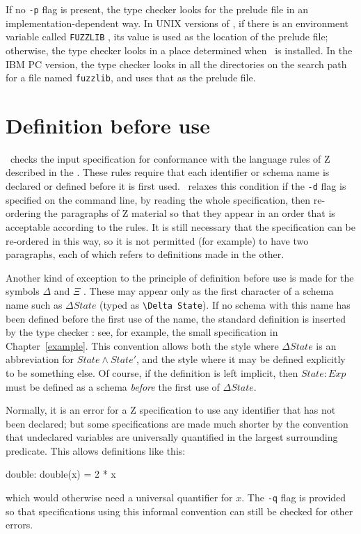 If no \verb/-p/ flag is present, the type checker
looks for the prelude file in an
implementation-dependent way.  In UNIX versions of \fuzz, if there
is an environment variable called \verb/FUZZLIB/%
, its value is used as the
location of the 
prelude file; otherwise, the type checker looks in a place
determined when \fuzz\ is installed.  In the IBM PC version, the
type checker looks in all the directories on the search path for a
file named \verb/fuzzlib/, and uses that as the prelude
file.

\section{Definition before use}

\Fuzz\ checks the input specification for conformance with the
language rules of Z described in the \ZRM. 
These rules require that each identifier or schema name is declared or
defined before it 
is first used. 
\Fuzz\ relaxes this condition if the \verb/-d/ flag is specified on
the command line, by reading the whole specification, then re-ordering
the paragraphs of Z material so that they appear in an order that is
acceptable according to the rules.
It is still necessary that the specification can be re-ordered in this
way, so it is not permitted (for example) to have two paragraphs, each
of which refers to definitions made in the other.

Another kind of exception to the principle of definition before use is
made for the symbols $\Delta$ and $\Xi$\index{|\Delta| ($\Delta$)}%
\index{|\Xi| ($\Xi$)}. These
may appear only as the first character of a schema name such as
$\Delta State$ (typed as \verb/\Delta State/). If no schema with
this name has been defined before the first use of the name, the
standard definition is inserted by the type checker%
: see, for example,
the small 
specification in Chapter~\ref{example}. This convention allows both
the style where $\Delta State$ is an abbreviation for $State \land
State'$, and the style where it may be defined explicitly to be
something else.  Of course, if the definition is left implicit, then
$State: Exp $ must be defined as a schema {\em before\/} the first use of
$\Delta State$.

Normally, it is an error for a Z specification to use any identifier
that has not been declared; but some specifications are made much
shorter by the convention that undeclared variables are
universally quantified in the largest surrounding
predicate.  This
allows definitions like this:
\begin{axdef}
        double: \nat \fun \nat
\where
        double(x) = 2 * x
\end{axdef}
which would otherwise need a universal quantifier for $x$.  The
\verb/-q/ flag is provided so that specifications
using this informal convention can still be checked for other
errors.

